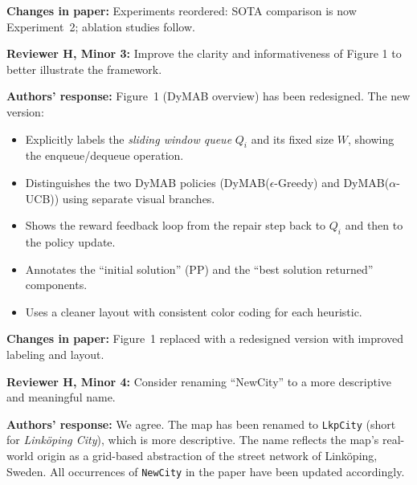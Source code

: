 \documentclass[review]{jair}
\begin{document}
\begin{changebox}
\textbf{Changes in paper:} Experiments reordered: SOTA comparison is now Experiment~2; ablation studies follow.
\end{changebox}

\bigskip

\begin{reviewerbox}
\textbf{Reviewer H, Minor 3:} Improve the clarity and informativeness of Figure 1 to better illustrate the framework.
\end{reviewerbox}

\begin{authorbox}
\textbf{Authors' response:} Figure~1 (DyMAB overview) has been redesigned. The new version:
\begin{itemize}[leftmargin=2em]
  \item Explicitly labels the \emph{sliding window queue} $Q_i$ and its fixed size $W$, showing the enqueue/dequeue operation.
  \item Distinguishes the two DyMAB policies (DyMAB($\epsilon$-Greedy) and DyMAB($\alpha$-UCB)) using separate visual branches.
  \item Shows the reward feedback loop from the repair step back to $Q_i$ and then to the policy update.
  \item Annotates the ``initial solution'' (PP) and the ``best solution returned'' components.
  \item Uses a cleaner layout with consistent color coding for each heuristic.
\end{itemize}
\end{authorbox}

\begin{changebox}
\textbf{Changes in paper:} Figure~1 replaced with a redesigned version with improved labeling and layout.
\end{changebox}

\bigskip

\begin{reviewerbox}
\textbf{Reviewer H, Minor 4:} Consider renaming ``NewCity'' to a more descriptive and meaningful name.
\end{reviewerbox}

\begin{authorbox}
\textbf{Authors' response:} We agree. The map has been renamed to \texttt{LkpCity} (short for \emph{Linköping City}), which is more descriptive. The name reflects the map's real-world origin as a grid-based abstraction of the street network of Linköping, Sweden. All occurrences of \texttt{NewCity} in the paper have been updated accordingly.
\end{authorbox}
\end{document}
